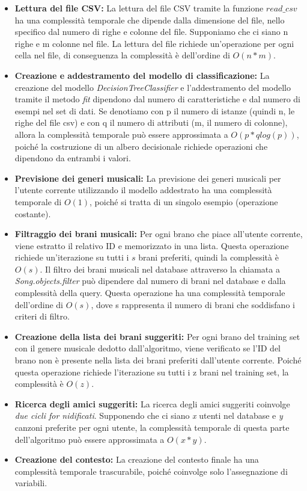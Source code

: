 \begin{itemize}
    \item \textbf{Lettura del file CSV:} La lettura del file CSV tramite la funzione $read\_csv$ ha una 
    complessità temporale che dipende dalla dimensione del file, nello specifico dal numero di righe e colonne del file.
    Supponiamo che ci siano n righe e m colonne nel file. La lettura del file richiede un'operazione 
    per ogni cella nel file, di conseguenza la complessità è dell'ordine di ${O(n*m)}$.
    \item \textbf{Creazione e addestramento del modello di classificazione:} La creazione del modello 
    \textit{DecisionTreeClassifier} e l'addestramento del modello tramite il metodo \textit{fit} dipendono dal numero di 
    caratteristiche e dal numero di esempi nel set di dati. Se denotiamo con p il numero di istanze (quindi n, le righe del file csv) 
    e con q il numero di attributi (m, il numero di colonne), allora la complessità temporale può essere approssimata a $O(p * q log(p))$, 
    poiché la costruzione di un albero decisionale richiede operazioni che dipendono da entrambi i valori.
    \item \textbf{Previsione dei generi musicali:} La previsione dei generi musicali per 
    l'utente corrente utilizzando il modello addestrato ha una complessità temporale di 
    $O(1)$, poiché si tratta di un singolo esempio (operazione costante).
    \item \textbf{Filtraggio dei brani musicali:} Per ogni brano che piace all'utente corrente, viene estratto il relativo
     ID e memorizzato in una lista. Questa operazione richiede un'iterazione su tutti i $s$ brani preferiti, quindi la 
     complessità è $O(s)$.
     Il filtro dei brani musicali nel database attraverso la chiamata 
    a \textit{Song.objects.filter} può dipendere dal numero di brani nel database e dalla complessità della query. 
    Questa operazione ha una complessità temporale dell'ordine di $O(s)$, dove s rappresenta il 
    numero di brani che soddisfano i criteri di filtro.
    \item \textbf{Creazione della lista dei brani suggeriti:} Per ogni brano del training set con il genere musicale dedotto
    dall'algoritmo, viene verificato se l'ID del brano non è presente nella lista dei brani preferiti dall'utente corrente. 
    Poiché questa operazione richiede l'iterazione su tutti i z brani nel training set, la complessità è $O(z)$.
    \item \textbf{Ricerca degli amici suggeriti:} La ricerca degli amici suggeriti coinvolge \textit{due cicli for nidificati}. 
    Supponendo che ci siano \textit{x} utenti nel database e \textit{y} canzoni preferite per ogni utente, la complessità temporale di questa
    parte dell'algoritmo può essere approssimata a $O(x * y)$.
    \item \textbf{Creazione del contesto:} La creazione del contesto finale ha una complessità temporale trascurabile, 
    poiché coinvolge solo l'assegnazione di variabili.
\end{itemize}
